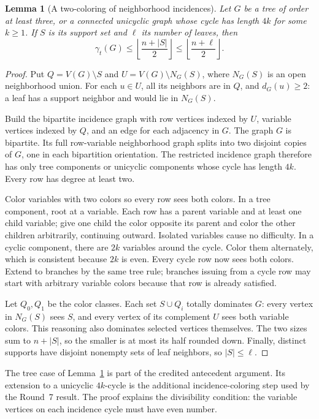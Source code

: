 \documentclass[11pt,a4paper]{article}
\newtheorem{lemma}[theorem]{Lemma}
\theoremstyle{definition}\newtheorem{definition}[theorem]{Definition}
\theoremstyle{remark}\newtheorem{remark}[theorem]{Remark}
\newcommand{\floor}[1]{\left\lfloor#1\right\rfloor}
\begin{document}
\begin{lemma}[A two-coloring of neighborhood incidences]
\label{early:lem:incidence-coloring}
Let $G$ be a tree of order at least three, or a connected unicyclic
graph whose cycle has length $4k$ for some $k\geq1$.  If $S$ is
its support set and $\ell$ its number of leaves, then
\[
 \gamma_t(G)\leq\floor{\frac{n+|S|}{2}}
                 \leq\floor{\frac{n+\ell}{2}}.
\]
\end{lemma}
\begin{proof}
Put $Q=V(G)\setminus S$ and $U=V(G)\setminus N_G(S)$, where
$N_G(S)$ is an open neighborhood union.  For each $u\in U$, all
its neighbors are in $Q$, and $d_G(u)\geq2$: a leaf has a support
neighbor and would lie in $N_G(S)$.

Build the bipartite incidence graph with row vertices indexed by
$U$, variable vertices indexed by $Q$, and an edge for each
adjacency in $G$.  The graph $G$ is bipartite.  Its full
row-variable neighborhood graph splits into two disjoint copies
of $G$, one in each bipartition orientation.  The restricted
incidence graph therefore has only tree components or unicyclic
components whose cycle has length $4k$.  Every row has degree at
least two.

Color variables with two colors so every row sees both colors.
In a tree component, root at a variable.  Each row has a parent
variable and at least one child variable; give one child the color
opposite its parent and color the other children arbitrarily,
continuing outward.  Isolated variables cause no difficulty.
In a cyclic component, there are $2k$ variables around the cycle.
Color them alternately, which is consistent because $2k$ is even.
Every cycle row now sees both colors.  Extend to branches by the
same tree rule; branches issuing from a cycle row may start with
arbitrary variable colors because that row is already satisfied.

Let $Q_0,Q_1$ be the color classes.  Each set $S\cup Q_i$ totally
dominates $G$: every vertex in $N_G(S)$ sees $S$, and every vertex
of its complement $U$ sees both variable colors.  This reasoning
also dominates selected vertices themselves.  The two sizes sum
to $n+|S|$, so the smaller is at most its half rounded down.
Finally, distinct supports have disjoint nonempty sets of leaf
neighbors, so $|S|\leq\ell$.
\end{proof}

The tree case of Lemma~\ref{early:lem:incidence-coloring} is part of
the credited antecedent argument.  Its extension to a unicyclic
$4k$-cycle is the additional incidence-coloring step used by the
Round~7 result.  The proof explains the divisibility condition:
the variable vertices on each incidence cycle must have even number.
\end{document}
